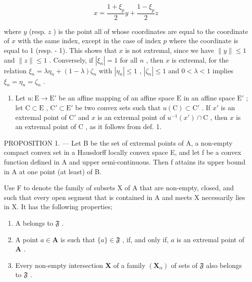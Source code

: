 \[
x = \frac {1 + \xi_ {p}}{2} y + \frac {1 - \xi_ {p}}{2} z
\]

where \(y\) (resp. \(z\) ) is the point all of whose coordinates are equal to the coordinate of \(x\) with the same index, except in the case of index \(p\) where the coordinate is equal to 1 (resp. - 1). This shows that \(x\) is not extremal, since we have \(\| y \| \leqslant 1\) and \(\| z \| \leqslant 1\) . Conversely, if \(|\xi_n| = 1\) for all \(n\) , then \(x\) is extremal, for the relation \(\xi_n = \lambda \eta_n + (1 - \lambda) \zeta_n\) with \(|\eta_n| \leqslant 1\) , \(|\zeta_n| \leqslant 1\) and \(0 < \lambda < 1\) implies \(\xi_n = \eta_n = \zeta_n\) .

\begin{enumerate}
\def\labelenumi{\arabic{enumi})}
\setcounter{enumi}{2}
\tightlist
\item
  Let \(u: \mathrm{E} \to \mathrm{E}'\) be an affine mapping of an affine space \(\mathrm{E}\) in an affine space \(\mathrm{E}'\) ; let \(\mathrm{C} \subset \mathrm{E}\) , \(\mathrm{C}' \subset \mathrm{E}'\) be two convex sets such that \(u(\mathrm{C}) \subset \mathrm{C}'\) . If \(x'\) is an extremal point of \(\mathrm{C}'\) and \(x\) is an extremal point of \(u^{-1}(x') \cap \mathrm{C}\) , then \(x\) is an extremal point of \(\mathrm{C}\) , as it follows from def. 1.
\end{enumerate}

PROPOSITION 1. --- Let B be the set of extremal points of A, a non-empty compact convex set in a Hausdorff locally convex space E, and let f be a convex function defined in A and upper semi-continuous. Then f attains its upper bound in A at one point (at least) of B.

Use F to denote the family of subsets X of A that are non-empty, closed, and such that every open segment that is contained in A and meets X necessarily lies in X. It has the following properties;

\begin{enumerate}
\def\labelenumi{(\roman{enumi})}
\item
  A belongs to \(\mathfrak{F}\) .
\item
  A point \(a \in \mathbf{A}\) is such that \(\{a\} \in \mathfrak{F}\) , if, and only if, \(a\) is an extremal point of \(\mathbf{A}\) .
\item
  Every non-empty intersection \(\mathbf{X}\) of a family \((\mathbf{X}_{\alpha})\) of sets of \(\mathfrak{F}\) also belongs to \(\mathfrak{F}\) .
\end{enumerate}

